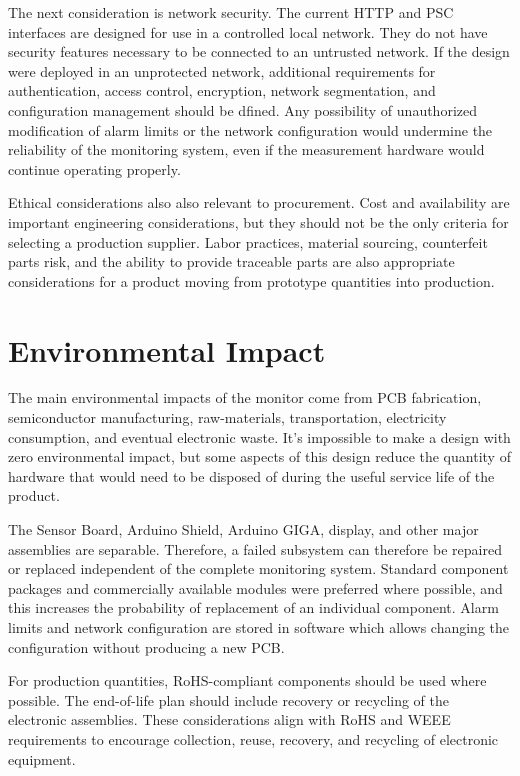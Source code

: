 The next consideration is network security. The current HTTP and PSC interfaces
are designed for use in a controlled local network. They do not have security features necessary to be connected to an untrusted network. If the design were deployed in an unprotected network, additional requirements for authentication, access control, encryption, network segmentation, and configuration management should be dfined. Any possibility of unauthorized modification of alarm limits or the network configuration would undermine the reliability of the monitoring system, even if the measurement hardware would continue operating properly.

Ethical considerations also also relevant to procurement. Cost and availability are important engineering considerations, but they should not be the only criteria for selecting a production supplier. Labor practices, material sourcing, counterfeit parts risk, and the ability to provide traceable parts are also appropriate considerations for a product moving from prototype quantities into
production.

\section{Environmental Impact}

The main environmental impacts of the monitor come from PCB fabrication,
semiconductor manufacturing, raw-materials, transportation, electricity consumption, and eventual electronic waste. It's impossible to make a design with zero environmental impact, but some aspects of this design reduce the quantity of hardware that would need to be disposed of during the useful service life of the product.

The Sensor Board, Arduino Shield, Arduino GIGA, display, and other major
assemblies are separable. Therefore, a failed subsystem can therefore be repaired or replaced independent of the complete monitoring system. Standard component
packages and commercially available modules were preferred where possible, and this increases the probability of replacement of an individual component. Alarm limits and network configuration are stored in software which allows changing the configuration without producing a new PCB.

For production quantities, RoHS-compliant
components should be used where possible. The end-of-life plan should include recovery or recycling of the electronic assemblies. These considerations align with RoHS and WEEE requirements to
encourage collection, reuse, recovery, and recycling of electronic equipment.

